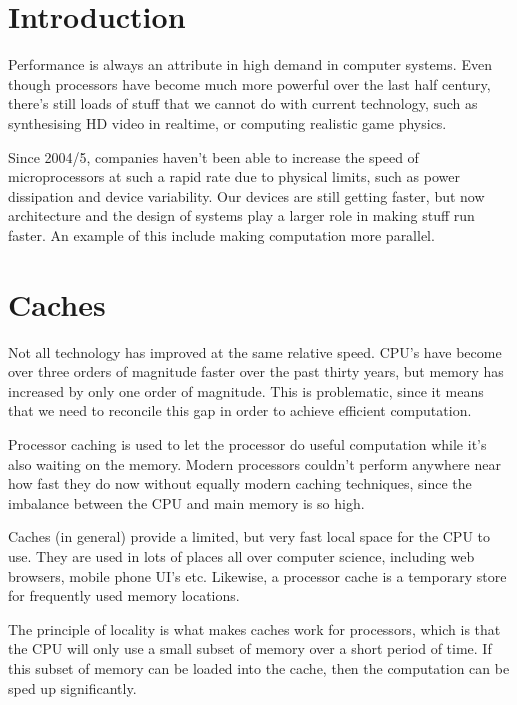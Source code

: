
\section{Introduction}

Performance is always an attribute in high demand in computer systems. Even
though processors have become much more powerful over the last half century,
there's still loads of stuff that we cannot do with current technology, such as
synthesising HD video in realtime, or computing realistic game physics.

Since 2004/5, companies haven't been able to increase the speed of
microprocessors at such a rapid rate due to physical limits, such as power
dissipation and device variability. Our devices are still getting faster, but
now architecture and the design of systems play a larger role in making stuff
run faster. An example of this include making computation more parallel.

\section{Caches}

Not all technology has improved at the same relative speed. CPU's have become
over three orders of magnitude faster over the past thirty years, but memory has
increased by only one order of magnitude. This is problematic, since it means
that we need to reconcile this gap in order to achieve efficient computation.

Processor caching is used to let the processor do useful computation while
it's also waiting on the memory. Modern processors couldn't perform anywhere
near how fast they do now without equally modern caching techniques, since the
imbalance between the CPU and main memory is so high.

Caches (in general) provide a limited, but very fast local space for the CPU to
use. They are used in lots of places all over computer science, including web
browsers, mobile phone UI's etc. Likewise, a processor cache is a temporary
store for frequently used memory locations.

The principle of locality is what makes caches work for processors, which is
that the CPU will only use a small subset of memory over a short period of time.
If this subset of memory can be loaded into the cache, then the computation can
be sped up significantly.

